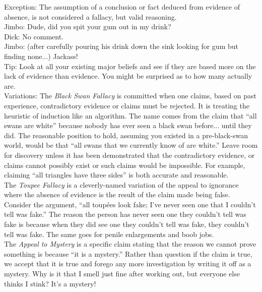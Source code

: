 \documentclass[a4paper,12pt,single,pdftex]{scrartcl}
\begin{document}
{    
      Exception: The assumption of a conclusion or fact deduced from evidence of absence, is not considered a fallacy, but valid reasoning. 
    \\

    
      Jimbo: Dude, did you spit your gum out in my drink?
    \\

    
      Dick: No comment.
    \\

    
      Jimbo: (after carefully pouring his drink down the sink looking for gum but finding none...)  Jackass!
    \\

    
      Tip: Look at all your existing major beliefs and see if they are based more on the lack of evidence than evidence.  You might be surprised as to how many actually are.
    \\

    
      Variations: The {\em Black Swan Fallacy} is committed when one claims, based on past experience, contradictory evidence or claims must be rejected. It is treating the heuristic of induction like an algorithm. The name comes from the claim that “all swans are white” because nobody has ever seen a black swan before... until they did. The reasonable position to hold, assuming you existed in a pre-black-swan world, would be that “all swans that we currently know of are white.” Leave room for discovery unless it has been demonstrated that the contradictory evidence, or claims cannot possibly exist or such claims would be impossible. For example, claiming “all triangles have three sides” is both accurate and reasonable.
    \\

    
      The {\em Toupee Fallacy} is a cleverly-named variation of the appeal to ignorance where the absence of evidence is the result of the claim made being false. Consider the argument, “all toupées look fake; I've never seen one that I couldn't tell was fake.” The reason the person has never seen one they couldn’t tell was fake is because when they did see one they couldn’t tell was fake, they couldn’t tell was fake. The same goes for penile enlargements and boob jobs.
    \\

    
      The {\em Appeal to Mystery} is a specific claim stating that the reason we cannot prove something is because “it is a mystery.” Rather than question if the claim is true, we accept that it is true and forego any more investigation by writing it off as a mystery. Why is it that I smell just fine after working out, but everyone else thinks I stink? It’s a mystery!
    \\

  }
\end{document}
